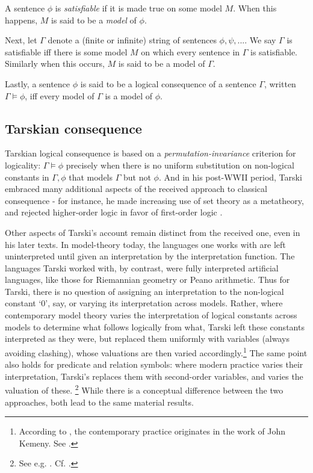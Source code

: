 \documentclass[]{article}
\begin{document}
A sentence $\phi$ is \textit{satisfiable} if it is made true on some model $M$. When this happens, $M$ is said to be a \textit{model} of $\phi$. 

Next, let $\Gamma$ denote a (finite or infinite) string of sentences $\phi, \psi, ...$. We say $\Gamma$ is satisfiable iff there is some model $M$ on which every sentence in $\Gamma$ is satisfiable. Similarly when this occurs, $M$ is said to be a model of $\Gamma$. 

Lastly, a sentence $\phi$ is said to be a logical consequence of a sentence $\Gamma$, written $\Gamma \models \phi$, iff every model of $\Gamma$ is a model of $\phi$.
\subsection{Tarskian consequence}
Tarskian logical consequence is based on a \textit{permutation-invariance} criterion for logicality: $\Gamma \models \phi$ precisely when there is no uniform substitution on  non-logical constants in $\Gamma, \phi$ that models $\Gamma$ but not $\phi$. And in his post-WWII period, Tarski embraced many additional aspects of the received approach to classical consequence - for instance, he made increasing use of set theory as a metatheory, and rejected higher-order logic in favor of first-order logic \cite{Tarski1987} \cite[372]{Corcoran2011}.

Other aspects of Tarski's account remain distinct from the received one, even in his later texts. In model-theory today, the languages one works with are left uninterpreted until given an interpretation by the interpretation function. The languages Tarski worked with, by contrast, were fully interpreted artificial languages, like those for Riemannian geometry or Peano arithmetic. Thus for Tarski, there is no question of assigning an interpretation to the non-logical constant `0', say, or varying its interpretation across models. Rather, where contemporary model theory varies the interpretation of logical constants across models to determine what follows logically from what, Tarski left these constants interpreted as they were, but replaced them uniformly with variables (always avoiding clashing), whose valuations are then varied accordingly.\footnote{According to \cite[433]{Schiemer2013}, the contemporary practice originates in the work of John Kemeny. See \cite{Kemeny1956} \cite{Kemeny1956b}.} The same point also holds for predicate and relation symbols: where modern practice varies their interpretation, Tarski's replaces them with second-order variables, and varies the valuation of these. \footnote{See e.g. \cite[122-23]{Tarski1941}. Cf. \cite[69]{Etchemendy1988} \cite[448]{Schiemer2013}.} While there is a conceptual difference between the two approaches, both lead to the same material results.
\end{document}
